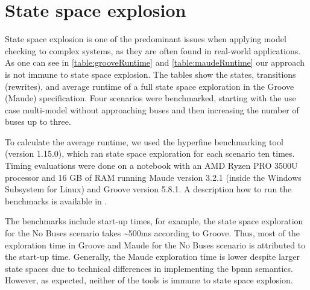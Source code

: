 \documentclass{jot}
\begin{document}
\section{State space explosion} \label{sec:state_space_explosion}
State space explosion is one of the predominant issues when applying model checking to complex systems, as they are often found in real-world applications.
As one can see in \cref{table:grooveRuntime} and \cref{table:maudeRuntime} our approach is not immune to state space explosion.
The tables show the states, transitions (rewrites), and average runtime of a full state space exploration in the Groove (Maude) specification.
Four scenarios were benchmarked, starting with the use case multi-model without approaching buses and then increasing the number of buses up to three.

To calculate the average runtime, we used the hyperfine benchmarking tool \cite{peterHyperfine2022} (version 1.15.0), which ran state space exploration for each scenario ten times.
Timing evaluations were done on a notebook with an AMD Ryzen PRO 3500U processor and 16 GB of RAM running Maude version 3.2.1 (inside the Windows Subsystem for Linux) and Groove version 5.8.1.
A description how to run the benchmarks is available in \cite{krauterArtifactsBehavioralConsistency2022}.

The benchmarks include start-up times, for example, the state space exploration for the \textsf{No Buses} scenario takes \textasciitilde 500ms according to Groove.
Thus, most of the exploration time in Groove and Maude for the \textsf{No Buses} scenario is attributed to the start-up time.
Generally, the Maude exploration time is lower despite larger state spaces due to technical differences in implementing the \gls*{bpmn} semantics.
However, as expected, neither of the tools is immune to state space explosion.
\end{document}

